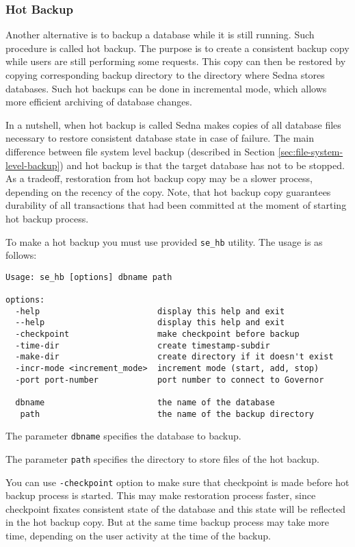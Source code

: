 \documentclass[a4paper,12pt]{article}
\begin{document}
\subsubsection{Hot Backup}

Another alternative is to backup a database while it is still running. Such
procedure is called hot backup. The purpose is to create a consistent backup
copy while users are still performing some requests. This copy can then be
restored by copying corresponding backup directory to the directory where Sedna
stores databases. Such hot backups can be done in incremental mode, which allows
more efficient archiving of database changes.

In a nutshell, when hot backup is called Sedna makes copies of all database
files necessary to restore consistent database state in case of failure. The
main difference between file system level backup (described in Section
\ref{sec:file-system-level-backup}) and hot backup is that the target database
has not to be stopped. As a tradeoff, restoration from hot backup copy may be a
slower process, depending on the recency of the copy. Note, that hot backup copy
guarantees durability of all transactions that had been committed at the moment
of starting hot backup process.

To make a hot backup you must use provided \verb!se_hb! utility. The usage is as
follows:

\small{
\begin{verbatim}
Usage: se_hb [options] dbname path

options:
  -help                        display this help and exit
  --help                       display this help and exit
  -checkpoint                  make checkpoint before backup
  -time-dir                    create timestamp-subdir
  -make-dir                    create directory if it doesn't exist
  -incr-mode <increment_mode>  increment mode (start, add, stop)
  -port port-number            port number to connect to Governor

  dbname                       the name of the database
   path                        the name of the backup directory
\end{verbatim}}

The parameter \verb!dbname! specifies the database to backup.

The parameter \verb!path! specifies the directory to store files of the hot
backup.

You can use \verb!-checkpoint! option to make sure that checkpoint is made
before hot backup process is started. This may make restoration process faster,
since checkpoint fixates consistent state of the database and this state will be
reflected in the hot backup copy. But at the same time backup process may take
more time, depending on the user activity at the time of the backup.
\end{document}
